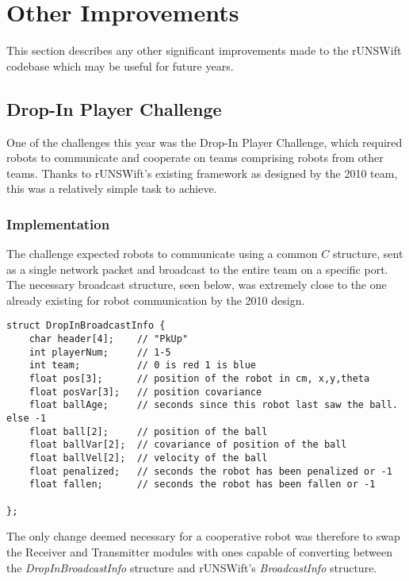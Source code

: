 \chapter{Other Improvements}
\label{chap:misc}

This section describes any other significant improvements made to the rUNSWift codebase which may be useful for future years.

\section{Drop-In Player Challenge}

One of the challenges this year was the Drop-In Player Challenge, which required robots to communicate and cooperate on teams comprising robots from other teams. Thanks to rUNSWift's existing framework as designed by the 2010 team\cite{runswift_2010}, this was a relatively simple task to achieve.

\subsection{Implementation}

The challenge expected robots to communicate using a common $C$ structure, sent as a single network packet and broadcast to the entire team on a specific port. The necessary broadcast structure, seen below, was extremely close to the one already existing for robot communication by the 2010 design. 

\begin{lstlisting}
struct DropInBroadcastInfo {
    char header[4];    // "PkUp"
    int playerNum;     // 1-5
    int team;          // 0 is red 1 is blue
    float pos[3];      // position of the robot in cm, x,y,theta
    float posVar[3];   // position covariance
    float ballAge;     // seconds since this robot last saw the ball. else -1
    float ball[2];     // position of the ball
    float ballVar[2];  // covariance of position of the ball
    float ballVel[2];  // velocity of the ball
    float penalized;   // seconds the robot has been penalized or -1
    float fallen;      // seconds the robot has been fallen or -1

};
\end{lstlisting}

The only change deemed necessary for a cooperative robot was therefore to swap the Receiver and Transmitter modules with ones capable of converting between the \textit{DropInBroadcastInfo } structure and rUNSWift's \textit{BroadcastInfo} structure.

